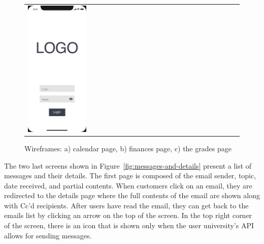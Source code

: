 \begin{figure}[htb]
\begin{tabular}{@{}lll@{}}
        \includegraphics[page=3,width=0.300\textwidth]{fig03/jsos_helper_wireframe.pdf} \\
    \end{tabular}
    \caption{Wireframes: a) calendar page, b) finances page, c) the grades page} \label{fig:calendar-finances-grades}
\end{figure}

The two last screens shown in Figure~\ref{fig:messages-and-details} present a list of messages and their details. The first page is composed of the email sender, topic, date received, and partial contents. When customers click on an email, they are redirected to the details page where the full contents of the email are shown along with Cc'd recipients. After users have read the email, they can get back to the emails list by clicking an arrow on the top of the screen. In the top right corner of the screen, there is an icon that is shown only when the user university's API allows for sending messages.


